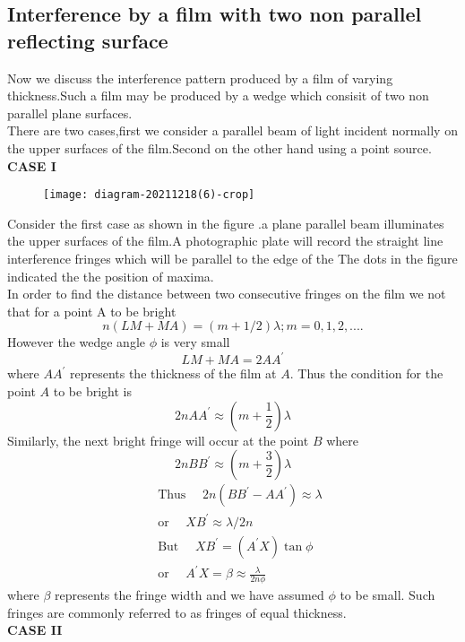 \subsection{Interference by a film with two non parallel reflecting surface}
Now we discuss the interference pattern produced by a film of varying thickness.Such a film may be produced by a wedge which consisit of two non parallel plane surfaces.\\
There are  two cases,first we consider a parallel beam of light incident normally on the upper surfaces of the film.Second on the other hand using a point source.\\
\textbf{CASE I}\\
\begin{figure}[H]
	\centering
	\texttt{[image: diagram-20211218(6)-crop]}
	\caption{}
	\label{}
\end{figure}
Consider the first case as shown in the figure .a plane parallel beam illuminates the upper surfaces of the film.A photographic plate will record the straight line interference fringes which will be parallel to the edge of the The dots in the figure indicated the the position of maxima.\\
In order to find the distance between two consecutive fringes on the film  we not that for a point  A to be bright\\
$$ n(LM+MA)=\left( m+1/2\right) \lambda ; m=0,1,2,....$$
However the wedge angle $\phi$ is very small $$LM+MA=2AA^{\prime}$$
where $A A^{\prime}$ represents the thickness of the film at $A$. Thus the condition for the point $A$ to be bright is
$$
2 n A A^{\prime} \approx\left(m+\frac{1}{2}\right) \lambda
$$
Similarly, the next bright fringe will occur at the point $B$ where
$$
2 n B B^{\prime} \approx\left(m+\frac{3}{2}\right) \lambda
$$
$$\begin{aligned}
&\text { Thus } \quad 2 n\left(B B^{\prime}-A A^{\prime}\right) \approx \lambda \\
&\text { or } \quad X B^{\prime} \approx \lambda / 2 n \\
&\text { But } \quad X B^{\prime}=\left(A^{\prime} X\right) \tan \phi \\
&\text { or } \quad A^{\prime} X=\beta \approx \frac{\lambda}{2 n \phi}
\end{aligned}$$
where $\beta$ represents the fringe width and we have assumed $\phi$ to be small. Such fringes are commonly referred to as fringes of equal thickness.\\
\textbf{CASE II}\\
